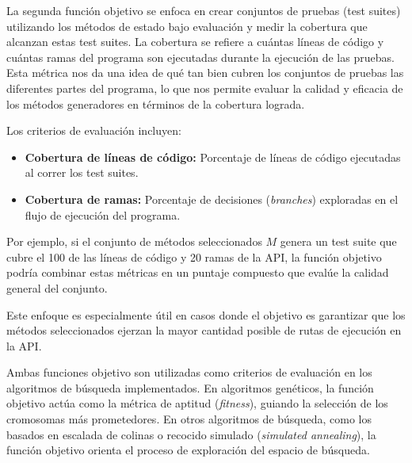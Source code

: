 
La segunda función objetivo se enfoca en crear conjuntos de pruebas (test suites) utilizando los métodos de estado bajo evaluación y medir la cobertura que alcanzan estas test suites. La cobertura se refiere a cuántas líneas de código y cuántas ramas del programa son ejecutadas durante la ejecución de las pruebas. Esta métrica nos da una idea de qué tan bien cubren los conjuntos de pruebas las diferentes partes del programa, lo que nos permite evaluar la calidad y eficacia de los métodos generadores en términos de la cobertura lograda.

Los criterios de evaluación incluyen:
\begin{itemize}
    \item \textbf{Cobertura de líneas de código:} Porcentaje de líneas de código ejecutadas al correr los test suites.
    \item \textbf{Cobertura de ramas:} Porcentaje de decisiones (\textit{branches}) exploradas en el flujo de ejecución del programa.
\end{itemize}

Por ejemplo, si el conjunto de métodos seleccionados $M$ genera un test suite que cubre el 100 de las líneas de código y 20 ramas de la API, la función objetivo podría combinar estas métricas en un puntaje compuesto que evalúe la calidad general del conjunto.

Este enfoque es especialmente útil en casos donde el objetivo es garantizar que los métodos seleccionados ejerzan la mayor cantidad posible de rutas de ejecución en la API.

Ambas funciones objetivo son utilizadas como criterios de evaluación en los algoritmos de búsqueda implementados. En algoritmos genéticos, la función objetivo actúa como la métrica de aptitud (\textit{fitness}), guiando la selección de los cromosomas más prometedores. En otros algoritmos de búsqueda, como los basados en escalada de colinas o recocido simulado (\textit{simulated annealing}), la función objetivo orienta el proceso de exploración del espacio de búsqueda.

